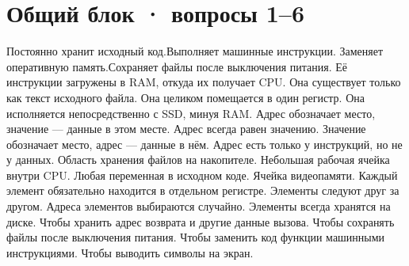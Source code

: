 \section*{Общий блок · вопросы 1–6}
\begin{enumerate}
\setlength{\itemsep}{4mm}
  {Постоянно хранит исходный код.}{Выполняет машинные инструкции.}
  {Заменяет оперативную память.}{Сохраняет файлы после выключения питания.}
  {Её инструкции загружены в RAM, откуда их получает CPU.}
  {Она существует только как текст исходного файла.}
  {Она целиком помещается в один регистр.}
  {Она исполняется непосредственно с SSD, минуя RAM.}
  {Адрес обозначает место, значение — данные в этом месте.}
  {Адрес всегда равен значению.}
  {Значение обозначает место, адрес — данные в нём.}
  {Адрес есть только у инструкций, но не у данных.}
  {Область хранения файлов на накопителе.}
  {Небольшая рабочая ячейка внутри CPU.}
  {Любая переменная в исходном коде.}
  {Ячейка видеопамяти.}
  {Каждый элемент обязательно находится в отдельном регистре.}
  {Элементы следуют друг за другом.}
  {Адреса элементов выбираются случайно.}
  {Элементы всегда хранятся на диске.}
  {Чтобы хранить адрес возврата и другие данные вызова.}
  {Чтобы сохранять файлы после выключения питания.}
  {Чтобы заменить код функции машинными инструкциями.}
  {Чтобы выводить символы на экран.}
\end{enumerate}
